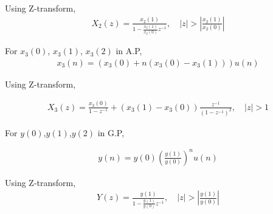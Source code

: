 \documentclass[journal,12pt,twocolumn]{IEEEtran}
\providecommand{\brak}[1]{\ensuremath{\left(#1\right)}}
\theoremstyle{remark}
\providecommand{\abs}[1]{\left\vert#1\right\vert}
\begin{document}
Using Z-transform,
\begin{align}
X_2(z) = \frac{x_2(1)}{1-\frac{x_2(1)}{x_2(0)}z^{-1}},  \quad \abs{z}>\abs{\frac{x_2(1)}{x_2(0)}}
\end{align}

For $x_3(0)$, $x_3(1)$, $x_3(2)$ in A.P,
\begin{align}
x_3(n) = \brak{x_3(0) + n\brak{x_3(0) - x_3(1)}}u(n)
\end{align}

Using Z-transform,

\begin{align}
X_3(z) = \frac{x_3(0)}{1-z^{-1}} + \brak{x_3(1) - x_3(0)}\frac{z^{-1}}{(1-z^{-1})^2} ,
\quad |z| > 1
\end{align}

For $y(0)$,$y(1)$,$y(2)$ in G.P,

\begin{align}
y(n) = y(0)\brak{\frac{y(1)}{y(0)}}^n u(n)
\end{align}

Using Z-transform,
\begin{align}
Y(z) = \frac{y(1)}{1-\frac{y(1)}{y(0)}z^{-1}}, \quad \abs{z}>\abs{\frac{y(1)}{y(0)}}
\end{align}
\end{document}
